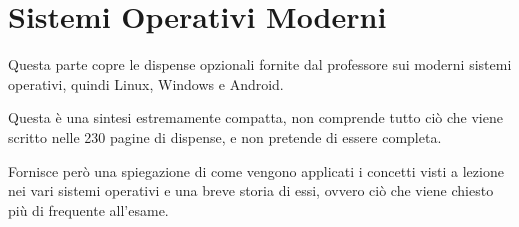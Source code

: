 \chapter{Sistemi Operativi Moderni}
Questa parte copre le dispense opzionali fornite dal professore sui moderni sistemi operativi, quindi Linux, Windows e Android.

\spacer
Questa è una sintesi estremamente compatta, non comprende tutto ciò che viene scritto nelle 230 pagine di dispense, e non pretende di essere completa.

Fornisce però una spiegazione di come vengono applicati i concetti visti a lezione nei vari sistemi operativi e una breve storia di essi, ovvero ciò che viene chiesto più di frequente all'esame.



